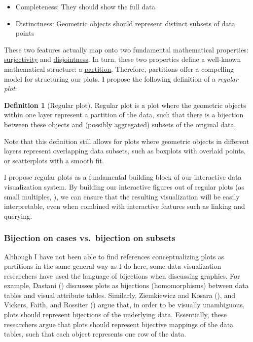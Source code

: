 \documentclass[
  openany]{book}
\providecommand{\tightlist}{%
  \setlength{\itemsep}{0pt}\setlength{\parskip}{0pt}}
\theoremstyle{definition}
\newtheorem{definition}{Definition}[chapter]
\theoremstyle{definition}
\theoremstyle{definition}
\theoremstyle{definition}
\theoremstyle{remark}
\begin{document}
\begin{itemize}
\tightlist
\item
  Completeness: They should show the full data
\item
  Distinctness: Geometric objects should represent distinct subsets of data points
\end{itemize}

These two features actually map onto two fundamental mathematical properties: \hyperref[functions]{surjectivity} and \hyperref[partitions]{disjointness}. In turn, these two properties define a well-known mathematical structure: a \hyperref[partitions]{partition}. Therefore, partitions offer a compelling model for structuring our plots. I propose the following definition of a \emph{regular plot}:

\begin{definition}[Regular plot]
Regular plot is a plot where the geometric objects within one layer represent a partition of the data, such that there is a bijection between these objects and (possibly aggregated) subsets of the original data.
\end{definition}

Note that this definition still allows for plots where geometric objects in different layers represent overlapping data subsets, such as boxplots with overlaid points, or scatterplots with a smooth fit.

I propose regular plots as a fundamental building block of our interactive data visualization system. By building our interactive figures out of regular plots (as small multiples, ), we can ensure that the resulting visualization will be easily interpretable, even when combined with interactive features such as linking and querying.

\subsubsection{Bijection on cases vs.~bijection on subsets}\label{bijection-on-cases-vs.-bijection-on-subsets}

Although I have not been able to find references conceptualizing plots as partitions in the same general way as I do here, some data visualization researchers have used the language of bijections when discussing graphics. For example, Dastani () discusses plots as bijections (homomorphisms) between data tables and visual attribute tables. Similarly, Ziemkiewicz and Kosara (), and Vickers, Faith, and Rossiter () argue that, in order to be visually unambiguous, plots should represent bijections of the underlying data. Essentially, these researchers argue that plots should represent bijective mappings of the data tables, such that each object represents one row of the data.
\end{document}
